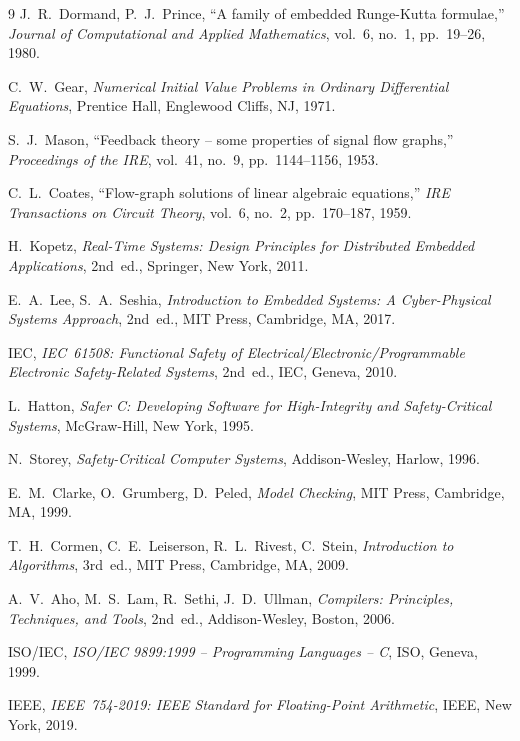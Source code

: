 ﻿\documentclass[12pt,a4paper]{article}
\theoremstyle{definition}
\begin{document}
\begin{thebibliography}{9}
  J.~R.~Dormand, P.~J.~Prince,
  ``A family of embedded Runge-Kutta formulae,''
  \emph{Journal of Computational and Applied Mathematics}, vol.~6, no.~1,
  pp.~19--26, 1980.

  C.~W.~Gear,
  \emph{Numerical Initial Value Problems in Ordinary Differential Equations},
  Prentice Hall, Englewood Cliffs, NJ, 1971.

  S.~J.~Mason,
  ``Feedback theory -- some properties of signal flow graphs,''
  \emph{Proceedings of the IRE}, vol.~41, no.~9, pp.~1144--1156, 1953.

  C.~L.~Coates,
  ``Flow-graph solutions of linear algebraic equations,''
  \emph{IRE Transactions on Circuit Theory}, vol.~6, no.~2, pp.~170--187, 1959.

  H.~Kopetz,
  \emph{Real-Time Systems: Design Principles for Distributed Embedded Applications},
  2nd~ed., Springer, New York, 2011.

  E.~A.~Lee, S.~A.~Seshia,
  \emph{Introduction to Embedded Systems: A Cyber-Physical Systems Approach},
  2nd~ed., MIT Press, Cambridge, MA, 2017.

  IEC,
  \emph{IEC~61508: Functional Safety of Electrical/Electronic/Programmable
  Electronic Safety-Related Systems},
  2nd~ed., IEC, Geneva, 2010.

  L.~Hatton,
  \emph{Safer C: Developing Software for High-Integrity and Safety-Critical Systems},
  McGraw-Hill, New York, 1995.

  N.~Storey,
  \emph{Safety-Critical Computer Systems},
  Addison-Wesley, Harlow, 1996.

  E.~M.~Clarke, O.~Grumberg, D.~Peled,
  \emph{Model Checking},
  MIT Press, Cambridge, MA, 1999.

  T.~H.~Cormen, C.~E.~Leiserson, R.~L.~Rivest, C.~Stein,
  \emph{Introduction to Algorithms},
  3rd~ed., MIT Press, Cambridge, MA, 2009.

  A.~V.~Aho, M.~S.~Lam, R.~Sethi, J.~D.~Ullman,
  \emph{Compilers: Principles, Techniques, and Tools},
  2nd~ed., Addison-Wesley, Boston, 2006.

  ISO/IEC,
  \emph{ISO/IEC 9899:1999 -- Programming Languages -- C},
  ISO, Geneva, 1999.

  IEEE,
  \emph{IEEE~754-2019: IEEE Standard for Floating-Point Arithmetic},
  IEEE, New York, 2019.


\end{thebibliography}
\end{document}
